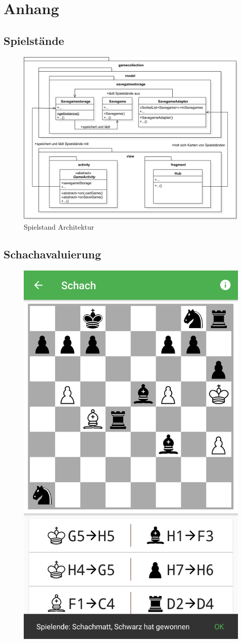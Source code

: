 \chapter{Anhang}

\section{Spielstände}
\sectionauthor{\leonard}

\begin{figure}[h]
	\centering
	\includegraphics[width=1.0\textwidth]{resources/savegamestorage/Savegamestorage}
	\caption{Spielstand Architektur}
\end{figure}

\section{Schachavaluierung}

\begin{figure}[p]
\centering
\includegraphics[width=.3\textwidth]{resources/evaluierung/chess/screen}
\caption{}
\label{fig:screen}
\end{figure}


